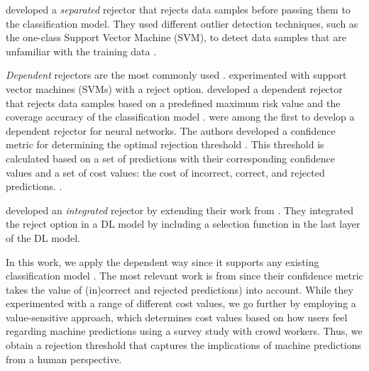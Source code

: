 %
\citet{coenen2020probability} developed a \emph{separated} rejector that rejects data samples before passing them to the classification model.
%
They used different outlier detection techniques, such as the one-class Support Vector Machine (SVM), to detect data samples that are unfamiliar with
the training data  \citep{coenen2020probability}.
%

%
\emph{Dependent} rejectors are the most commonly used \citep{Geifman2017Selective, de2000reject, grandvalet2008reject}.
%
\citet{grandvalet2008reject} experimented with support vector machines (SVMs) with a reject option.
%
\citet{Geifman2017Selective} developed a dependent rejector that rejects data samples based on a predefined maximum risk value and the coverage accuracy of the classification model \citep{Geifman2017Selective}.
%
\citet{de2000reject} were among the first to develop a dependent rejector for neural networks.
%
The authors developed a confidence metric for determining the optimal rejection threshold \citep{de2000reject}.
%
This threshold is calculated based on a set of predictions with their corresponding confidence values and a set of cost values: the cost of incorrect, correct, and rejected predictions. \citep{de2000reject}.
%

%
\citet{geifman2019reject} developed an \emph{integrated} rejector by extending their work from \citet{Geifman2017Selective}.
%
They integrated the reject option in a DL model by including a selection function in the last layer of the DL model.
%

In this work, we apply the dependent way since it supports any existing classification model \citep{hendrickx2021machine}.
%
The most relevant work is from \citet{de2000reject} since their confidence metric takes the value of (in)correct and rejected predictions) into account.
%
While they experimented with a range of different cost values, we go further by employing a value-sensitive approach, which determines cost values based on how users feel regarding machine predictions using a survey study with crowd workers.
%
Thus, we obtain a rejection threshold that captures the implications of machine predictions from a human perspective.

